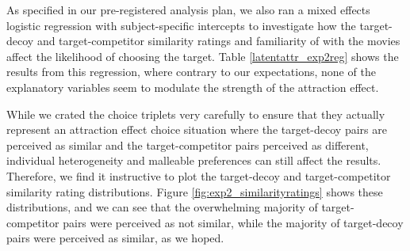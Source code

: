 \documentclass[12pt, a4paper]{article}
\begin{document}
As specified in our pre-registered analysis plan, we also ran a mixed effects logistic regression with subject-specific intercepts to investigate how the target-decoy and target-competitor similarity ratings and familiarity of with the movies affect the likelihood of choosing the target. Table \ref{latentattr_exp2reg} shows the results from this regression, where contrary to our expectations, none of the explanatory variables seem to modulate the strength of the attraction effect. 

\begin{table}[!htbp] \centering 
\captionsetup{justification=centering}
  \caption{Odds-ratios and 95\% CIs from a mixed-effects logistic model with subject-specific intercepts. (T - Target, C - Competitor, D - Decoy)} 
  \label{latentattr_exp2reg} 
\end{table}

While we crated the choice triplets very carefully to ensure that they actually represent an attraction effect choice situation where the target-decoy pairs are perceived as similar and the target-competitor pairs perceived as different, individual heterogeneity and malleable preferences can still affect the results. Therefore, we find it instructive to plot the target-decoy and target-competitor similarity rating distributions. Figure \ref{fig:exp2_similarityratings} shows these distributions, and we can see that the overwhelming majority of target-competitor pairs were perceived as not similar, while the majority of target-decoy pairs were perceived as similar, as we hoped.
\end{document}
